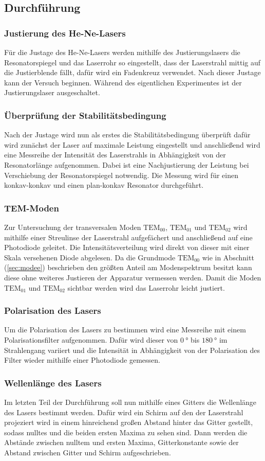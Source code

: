 \subsection{Durchführung}
\subsubsection{Justierung des He-Ne-Lasers}
Für die Justage des He-Ne-Lasers werden mithilfe des Justierungslasers die Resonatorspiegel und das Laserrohr so eingestellt, dass der Laserstrahl mittig auf die Justierblende fällt, dafür wird ein Fadenkreuz verwendet.
Nach dieser Justage kann der Versuch beginnen. Während des eigentlichen Experimentes ist der Justierungslaser ausgeschaltet.
\subsubsection{Überprüfung der Stabilitätsbedingung}
Nach der Justage wird nun als erstes die Stabilitätsbedingung überprüft dafür wird zunächst der Laser auf maximale Leistung eingestellt und anschließend wird eine Messreihe der Intensität des Laserstrahls in Abhängigkeit von
der Resonatorlänge aufgenommen. Dabei ist eine Nachjustierung der Leistung bei Verschiebung der Resonatorspiegel notwendig. Die Messung wird für einen konkav-konkav und einen plan-konkav Resonator durchgeführt.
\subsubsection{TEM-Moden}
Zur Untersuchung der transversalen Moden $\mathrm{TEM}_\mathrm{00}$, $\mathrm{TEM}_\mathrm{01}$ und $\mathrm{TEM}_\mathrm{02}$ wird mithilfe einer Streulinse der Laserstrahl aufgefächert und anschließend auf eine Photodiode geleitet.
Die Intensitätsverteilung wird direkt von dieser mit einer Skala versehenen Diode abgelesen. Da die Grundmode $\mathrm{TEM}_\mathrm{00}$ wie in Abschnitt (\ref{sec:modee}) beschrieben den größten Anteil am Modenspektrum besitzt kann
diese ohne weiteres Justieren der Apparatur vermessen werden. Damit die Moden $\mathrm{TEM}_\mathrm{01}$ und $\mathrm{TEM}_\mathrm{02}$ sichtbar werden wird das Laserrohr leicht justiert.
\subsubsection{Polarisation des Lasers}
\label{sec:polari}
Um die Polarisation des Lasers zu bestimmen wird eine Messreihe mit einem Polarisationsfilter aufgenommen. Dafür wird dieser von $\SI{0}{\degree}$ bis $\SI{180}{\degree}$ im Strahlengang variiert und die Intensität in Abhängigkeit von der Polarisation des Filter wieder mithilfe einer Photodiode gemessen.
\subsubsection{Wellenlänge des Lasers}
Im letzten Teil der Durchführung soll nun mithilfe eines Gitters die Wellenlänge des Lasers bestimmt werden. Dafür wird ein Schirm auf den der Laserstrahl projeziert wird in einem hinreichend großen Abstand hinter das Gitter gestellt, sodass nulltes und die beiden ersten Maxima zu sehen sind. Dann werden die Abstände zwischen nulltem und ersten Maxima, Gitterkonstante sowie der Abstand zwischen Gitter und Schirm aufgeschrieben.
